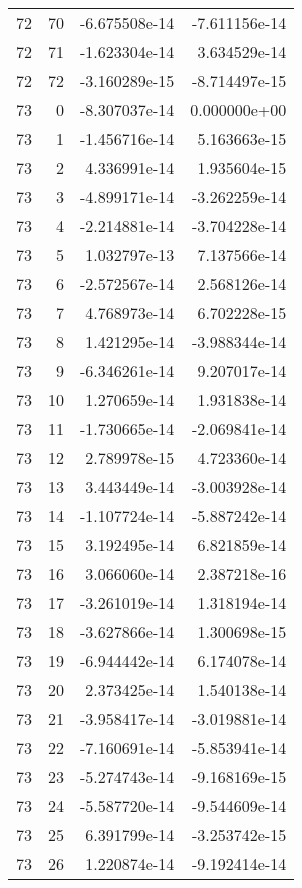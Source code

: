 \begin{tabular}{rrrr}
  72 &   70 & -6.675508e-14 & -7.611156e-14 \\
  72 &   71 & -1.623304e-14 &  3.634529e-14 \\
  72 &   72 & -3.160289e-15 & -8.714497e-15 \\
  73 &    0 & -8.307037e-14 &  0.000000e+00 \\
  73 &    1 & -1.456716e-14 &  5.163663e-15 \\
  73 &    2 &  4.336991e-14 &  1.935604e-15 \\
  73 &    3 & -4.899171e-14 & -3.262259e-14 \\
  73 &    4 & -2.214881e-14 & -3.704228e-14 \\
  73 &    5 &  1.032797e-13 &  7.137566e-14 \\
  73 &    6 & -2.572567e-14 &  2.568126e-14 \\
  73 &    7 &  4.768973e-14 &  6.702228e-15 \\
  73 &    8 &  1.421295e-14 & -3.988344e-14 \\
  73 &    9 & -6.346261e-14 &  9.207017e-14 \\
  73 &   10 &  1.270659e-14 &  1.931838e-14 \\
  73 &   11 & -1.730665e-14 & -2.069841e-14 \\
  73 &   12 &  2.789978e-15 &  4.723360e-14 \\
  73 &   13 &  3.443449e-14 & -3.003928e-14 \\
  73 &   14 & -1.107724e-14 & -5.887242e-14 \\
  73 &   15 &  3.192495e-14 &  6.821859e-14 \\
  73 &   16 &  3.066060e-14 &  2.387218e-16 \\
  73 &   17 & -3.261019e-14 &  1.318194e-14 \\
  73 &   18 & -3.627866e-14 &  1.300698e-15 \\
  73 &   19 & -6.944442e-14 &  6.174078e-14 \\
  73 &   20 &  2.373425e-14 &  1.540138e-14 \\
  73 &   21 & -3.958417e-14 & -3.019881e-14 \\
  73 &   22 & -7.160691e-14 & -5.853941e-14 \\
  73 &   23 & -5.274743e-14 & -9.168169e-15 \\
  73 &   24 & -5.587720e-14 & -9.544609e-14 \\
  73 &   25 &  6.391799e-14 & -3.253742e-15 \\
  73 &   26 &  1.220874e-14 & -9.192414e-14 \\

\end{tabular}
